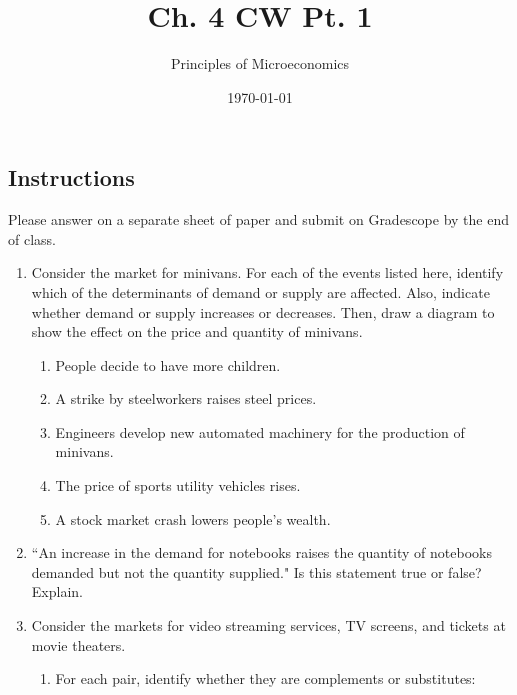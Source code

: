 \documentclass{article}
\title{Ch. 4 CW Pt. 1}
\author{Principles of Microeconomics}
\date{\today}
\begin{document}
\maketitle

\subsection*{Instructions} Please answer on a separate sheet of paper and submit on Gradescope by the end of class.

\begin{enumerate}

\item Consider the market for minivans. For each of the events listed here, identify which of the determinants of demand or supply are affected. Also, indicate whether demand or supply increases or decreases. Then, draw a diagram to show the effect on the price and quantity of minivans.

	\begin{enumerate}
	
	\item People decide to have more children.
	
	\item A strike by steelworkers raises steel prices.
	
	\item Engineers develop new automated machinery for the production of minivans.
	
	\item The price of sports utility vehicles rises.
	
	\item A stock market crash lowers people's wealth.
	
	\end{enumerate}
	
\item ``An increase in the demand for notebooks raises the quantity of notebooks demanded but not the quantity supplied." Is this statement true or false? Explain.

\item Consider the markets for video streaming services, TV screens, and tickets at movie theaters.

	\begin{enumerate}
	
	\item For each pair, identify whether they are complements or substitutes:
	
		\begin{itemize}
		

\end{itemize}
\end{enumerate}
\end{enumerate}
\end{document}
